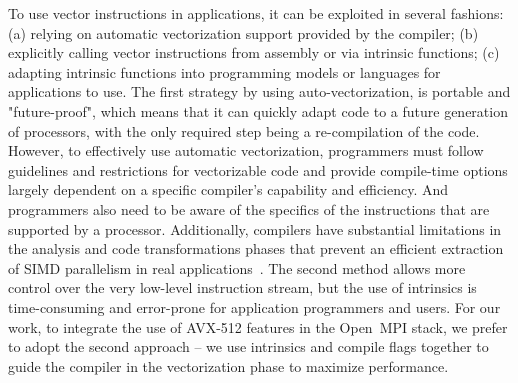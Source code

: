 \documentclass[5p,times,twocolumn]{elsarticle}
\newcommand{\ompi}[0]{Open~MPI\xspace}
\begin{document}
To use vector instructions in applications, it can be exploited in several fashions:
(a) relying on automatic vectorization support provided by the compiler;
(b) explicitly calling vector instructions from assembly or via intrinsic functions;
(c) adapting intrinsic functions into programming models or languages
for applications to use.
%
The first strategy by using auto-vectorization, is portable and
"future-proof", which means that it can quickly adapt code to a future
generation of processors, with the only required step being a
re-compilation of the code. However, to effectively use automatic
vectorization, programmers must follow guidelines and restrictions for
vectorizable code and provide compile-time options largely dependent
on a specific compiler's capability and efficiency.
%
And programmers also need to be aware of the specifics of the
instructions that are supported by a processor.  Additionally,
compilers have substantial limitations in the analysis and code
transformations phases that prevent an efficient extraction of SIMD
parallelism in real applications~\cite{autoEvaluation}.
%
The second method allows more control over the very low-level
instruction stream, but the use of intrinsics is time-consuming and
error-prone for application programmers and users.
%
For our work, to integrate the use of AVX-512 features in the \ompi
stack, we prefer to adopt the second approach -- we use intrinsics and
compile flags together to guide the compiler in the vectorization
phase to maximize performance.
\end{document}
